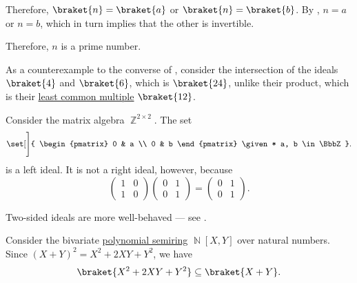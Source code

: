 \begin{example}
\begin{thmenum}
    Therefore, \( \braket{ n } = \braket{ a } \) or \( \braket{ n } = \braket{ b } \). By , \( n = a \) or \( n = b \), which in turn implies that the other is invertible.

    Therefore, \( n \) is a prime number.

     As a counterexample to the converse of , consider the intersection of the ideals \( \braket{ 4 } \) and \( \braket{ 6 } \), which is \( \braket{ 24 } \), unlike their product, which is their \hyperref[def:lcm]{least common multiple} \( \braket{ 12 } \).

     Consider the matrix algebra \( \BbbZ^{2 \times 2} \). The set
    \begin{equation*}
      \set[\Bigg]
      {
        \begin{pmatrix}
          0 & a \\
          0 & b
        \end{pmatrix}
        \given*
        a, b \in \BbbZ
      }.
    \end{equation*}
    is a left ideal. It is not a right ideal, however, because
    \begin{equation*}
      \begin{pmatrix}
        1 & 0 \\
        1 & 0
      \end{pmatrix}
      \begin{pmatrix}
        0 & 1 \\
        0 & 1
      \end{pmatrix}
      =
      \begin{pmatrix}
        0 & 1 \\
        0 & 1
      \end{pmatrix}.
    \end{equation*}

    Two-sided ideals are more well-behaved --- see .

     Consider the bivariate \hyperref[def:polynomial_algebra]{polynomial semiring} \( \BbbN[X, Y] \) over natural numbers. Since \( (X + Y)^2 = X^2 + 2XY + Y^2 \), we have
    \begin{equation*}
      \braket{ X^2 + 2XY + Y^2 } \subseteq \braket{ X + Y }.
    \end{equation*}


\end{thmenum}
\end{example}
